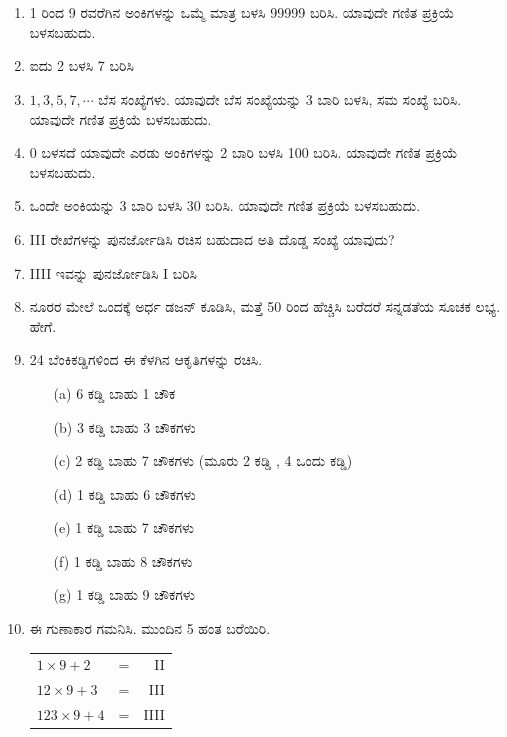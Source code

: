 \chapter[ಅಧ್ಯಾಯ 6]{}\label{chap6}

\begin{enumerate}
\renewcommand{\labelenumi}{\bf\theenumi.}
\itemsep=5pt

\item 1 ರಿಂದ 9 ರವರೆಗಿನ ಅಂಕಿಗಳನ್ನು ಒಮ್ಮೆ ಮಾತ್ರ ಬಳಸಿ 99999 ಬರಿಸಿ. ಯಾವುದೇ ಗಣಿತ ಪ್ರಕ್ರಿಯೆ ಬಳಸಬಹುದು. 

\item ಐದು 2 ಬಳಸಿ 7 ಬರಿಸಿ 

\item $1, 3, 5, 7, \cdots$ ಬೆಸ ಸಂಖ್ಯೆಗಳು. ಯಾವುದೇ ಬೆಸ ಸಂಖ್ಯೆಯನ್ನು 3 ಬಾರಿ ಬಳಸಿ, ಸಮ ಸಂಖ್ಯೆ ಬರಿಸಿ. ಯಾವುದೇ ಗಣಿತ ಪ್ರಕ್ರಿಯೆ ಬಳಸಬಹುದು. 

\item 0 ಬಳಸದೆ ಯಾವುದೇ ಎರಡು ಅಂಕಿಗಳನ್ನು 2 ಬಾರಿ ಬಳಸಿ 100 ಬರಿಸಿ. ಯಾವುದೇ ಗಣಿತ ಪ್ರಕ್ರಿಯೆ ಬಳಸಬಹುದು. 

\item ಒಂದೇ ಅಂಕಿಯನ್ನು 3 ಬಾರಿ ಬಳಸಿ 30 ಬರಿಸಿ. ಯಾವುದೇ ಗಣಿತ ಪ್ರಕ್ರಿಯೆ ಬಳಸಬಹುದು. 

\item III ರೇಖೆಗಳನ್ನು ಪುನರ್ಜೋಡಿಸಿ ರಚಿಸ ಬಹುದಾದ ಅತಿ ದೊಡ್ಡ ಸಂಖ್ಯೆ ಯಾವುದು? 

\item IIII ಇವನ್ನು ಪುನರ್ಜೋಡಿಸಿ I ಬರಿಸಿ 

\item ನೂರರ ಮೇಲೆ ಒಂದಕ್ಕೆ ಅರ್ಧ ಡಜನ್ ಕೂಡಿಸಿ, ಮತ್ತೆ 50 ರಿಂದ ಹೆಚ್ಚಿಸಿ ಬರೆದರೆ ಸನ್ನಡತೆಯ ಸೂಚಕ ಲಭ್ಯ. ಹೇಗೆ. 

\item  24 ಬೆಂಕಿಕಡ್ಡಿಗಳಿಂದ ಈ ಕೆಳಗಿನ ಆಕೃತಿಗಳನ್ನು ರಚಿಸಿ. 
\begin{itemize}
\item [(a)] 6 ಕಡ್ಡಿ ಬಾಹು 1 ಚೌಕ
\item [(b)] 3 ಕಡ್ಡಿ ಬಾಹು 3 ಚೌಕಗಳು  
\item [(c)]2 ಕಡ್ಡಿ ಬಾಹು 7 ಚೌಕಗಳು (ಮೂರು 2 ಕಡ್ಡಿ , 4 ಒಂದು ಕಡ್ಡಿ)
\item [(d)]1 ಕಡ್ಡಿ ಬಾಹು 6 ಚೌಕಗಳು  
\item [(e)]1 ಕಡ್ಡಿ ಬಾಹು 7 ಚೌಕಗಳು  
\item [(f)]1 ಕಡ್ಡಿ ಬಾಹು 8 ಚೌಕಗಳು 
\item [(g)]1 ಕಡ್ಡಿ ಬಾಹು 9 ಚೌಕಗಳು 
\end{itemize}

\item ಈ ಗುಣಾಕಾರ ಗಮನಿಸಿ. ಮುಂದಿನ 5 ಹಂತ ಬರೆಯಿರಿ. 

\begin{tabular}[t]{lcr}
$1 \times 9 + 2$ & = & II\\
$12 \times 9 + 3$ & = & III\\
$123\times 9 + 4$ & = & IIII
\end{tabular}


\end{enumerate}
